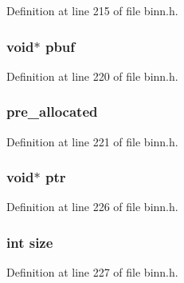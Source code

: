 Definition at line 215 of file binn.\+h.

\subsubsection[{\texorpdfstring{pbuf}{pbuf}}]{\setlength{\rightskip}{0pt plus 5cm}void$\ast$ pbuf}\hypertarget{structbinn__struct_abdefcde8a25619fc71ee548d5241cde0}{}\label{structbinn__struct_abdefcde8a25619fc71ee548d5241cde0}


Definition at line 220 of file binn.\+h.

\subsubsection[{\texorpdfstring{pre\+\_\+allocated}{pre_allocated}}]{ pre\+\_\+allocated}\hypertarget{structbinn__struct_ab479c42c8c6ffbcbd68ee197c31332f6}{}\label{structbinn__struct_ab479c42c8c6ffbcbd68ee197c31332f6}


Definition at line 221 of file binn.\+h.

\subsubsection[{\texorpdfstring{ptr}{ptr}}]{\setlength{\rightskip}{0pt plus 5cm}void$\ast$ ptr}\hypertarget{structbinn__struct_add9af9569af79ec26dd741fb226b38ba}{}\label{structbinn__struct_add9af9569af79ec26dd741fb226b38ba}


Definition at line 226 of file binn.\+h.

\subsubsection[{\texorpdfstring{size}{size}}]{\setlength{\rightskip}{0pt plus 5cm}int size}\hypertarget{structbinn__struct_a439227feff9d7f55384e8780cfc2eb82}{}\label{structbinn__struct_a439227feff9d7f55384e8780cfc2eb82}


Definition at line 227 of file binn.\+h.

